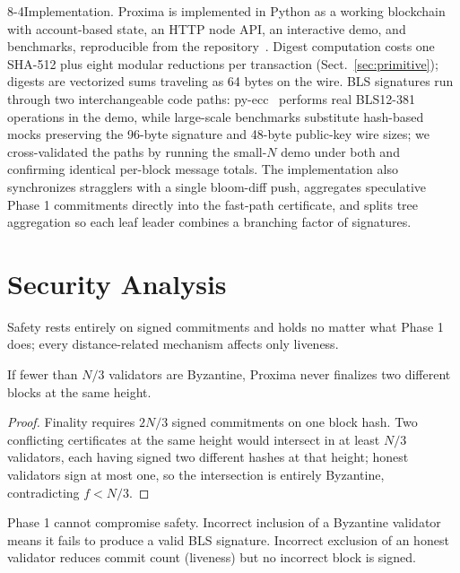 \documentclass[runningheads]{llncs}
\makeatletter
\renewcommand\paragraph{\@startsection{paragraph}{4}{\z@}%
  {8\p@ \@plus 2\p@ \@minus 2\p@}{-4\p@}{\normalfont\normalsize\bfseries\boldmath}}
\makeatother
\begin{document}
\paragraph{Implementation.}
\label{sec:implementation}
 Proxima is implemented in Python as a working blockchain with account-based state, an HTTP node API, an interactive demo, and benchmarks, reproducible from the repository~\cite{proxima-tr}. Digest computation costs one SHA-512 plus eight modular reductions per transaction (Sect.~\ref{sec:primitive}); digests are vectorized sums traveling as 64 bytes on the wire. BLS signatures run through two interchangeable code paths: py-ecc~\cite{pyecc} performs real BLS12-381 operations in the demo, while large-scale benchmarks substitute hash-based mocks preserving the 96-byte signature and 48-byte public-key wire sizes; we cross-validated the paths by running the small-$N$ demo under both and confirming identical per-block message totals. The implementation also synchronizes stragglers with a single bloom-diff push, aggregates speculative Phase 1 commitments directly into the fast-path certificate, and splits tree aggregation so each leaf leader combines a branching factor of signatures.

\section{Security Analysis}
\label{sec:security}
\label{sec:bloom-fp}

Safety rests entirely on signed commitments and holds no matter what Phase 1 does; every distance-related mechanism affects only liveness.

\label{sec:safety}
\begin{theorem}[Safety]
\label{thm:safety}
If fewer than $N/3$ validators are Byzantine, Proxima never finalizes two different blocks at the same height.
\end{theorem}

\begin{proof}
Finality requires $2N/3$ signed commitments on one block hash. Two conflicting certificates at the same height would intersect in at least $N/3$ validators, each having signed two different hashes at that height; honest validators sign at most one, so the intersection is entirely Byzantine, contradicting $f < N/3$.
\end{proof}

\begin{corollary}
Phase 1 cannot compromise safety. Incorrect inclusion of a Byzantine validator means it fails to produce a valid BLS signature. Incorrect exclusion of an honest validator reduces commit count (liveness) but no incorrect block is signed.
\end{corollary}
\end{document}
